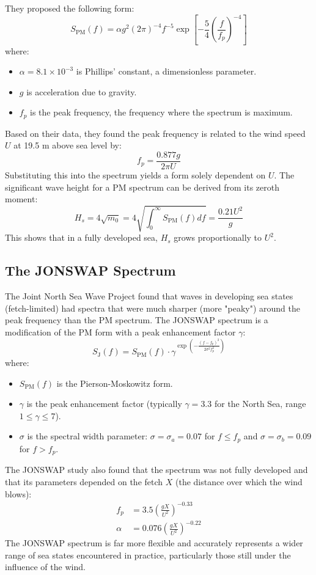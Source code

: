 \documentclass[11pt,letterpaper]{article}
\begin{document}
\noindent They proposed the following form:
\begin{equation}
S_{\text{PM}}(f) = \alpha g^2 (2\pi)^{-4} f^{-5} \exp\left[ -\frac{5}{4} \left( \frac{f}{f_p} \right)^{-4} \right]
\end{equation}
where:
\begin{itemize}
    \item $\alpha = 8.1 \times 10^{-3}$ is Phillips' constant, a dimensionless parameter.
    \item $g$ is acceleration due to gravity.
    \item $f_p$ is the peak frequency, the frequency where the spectrum is maximum.
\end{itemize}
Based on their data, they found the peak frequency is related to the wind speed $U$ at 19.5 m above sea level by:
\begin{equation}
f_p = \frac{0.877 g}{2\pi U}
\end{equation}
Substituting this into the spectrum yields a form solely dependent on $U$. The significant wave height for a PM spectrum can be derived from its zeroth moment:
\begin{equation}
H_s = 4\sqrt{m_0} = 4 \sqrt{ \int_0^{\infty} S_{\text{PM}}(f)  df } = \frac{0.21 U^2}{g}
\end{equation}
This shows that in a fully developed sea, $H_s$ grows proportionally to $U^2$.

\subsection{The JONSWAP Spectrum}
The Joint North Sea Wave Project found that waves in developing sea states (fetch-limited) had spectra that were much sharper (more "peaky") around the peak frequency than the PM spectrum. The JONSWAP spectrum is a modification of the PM form with a peak enhancement factor $\gamma$:
\begin{equation}
S_{\text{J}}(f) = S_{\text{PM}}(f) \cdot \gamma^{\exp\left( -\frac{(f - f_p)^2}{2\sigma^2 f_p^2} \right)}
\end{equation}
where:
\begin{itemize}
    \item $S_{\text{PM}}(f)$ is the Pierson-Moskowitz form.
    \item $\gamma$ is the peak enhancement factor (typically $\gamma=3.3$ for the North Sea, range $1 \leq \gamma \leq 7$).
    \item $\sigma$ is the spectral width parameter: $\sigma = \sigma_a = 0.07$ for $f \leq f_p$ and $\sigma = \sigma_b = 0.09$ for $f > f_p$.
\end{itemize}
The JONSWAP study also found that the spectrum was not fully developed and that its parameters depended on the fetch $X$ (the distance over which the wind blows):
\begin{align}
f_p &= 3.5 \left( \frac{gX}{U^2} \right)^{-0.33} \\
\alpha &= 0.076 \left( \frac{gX}{U^2} \right)^{-0.22}
\end{align}
The JONSWAP spectrum is far more flexible and accurately represents a wider range of sea states encountered in practice, particularly those still under the influence of the wind.
\end{document}
